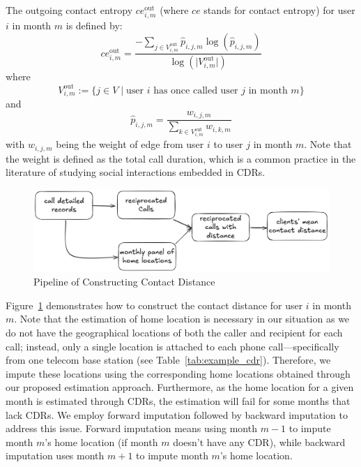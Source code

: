 \begin{definition}
The outgoing contact entropy $ce^{\text{out}}_{i,m}$ (where $ce$ stands for contact entropy) for user $i$ in month $m$ is defined by:
\[
ce^{\text{out}}_{i,m}
=
\frac
{-\sum_{j \in V^{\text{out}}_{i,m}}
\hat{p}_{i,j,m} \log(\hat{p}_{i,j,m})}{\log(\lvert V^\text{out}_{i, m} \rvert )}
\]
where
\begin{equation}\label{eq:outgoing_contacts}
V^{\text{out}}_{i,m}
:=
\{
j \in V
\mid
\text{user } i \text{ has once called user } j \text{ in month } m
\}
\end{equation}
and
\begin{equation}\label{eq:weight_j_for_i_in_month_m}
\hat{p}_{i,j,m}
= \frac{w_{i,j,m}}{\sum_{k \in V^{\text{out}}_{i,m}} w_{i,k,m}}
\end{equation}
with $w_{i,j,m}$ being the weight of edge from user $i$ to user $j$ in month $m$.
Note that the weight is defined as the total call duration, which is a common practice in the literature of studying social interactions embedded in CDRs.
\end{definition}

\begin{figure}[h!]
\centering
\caption{Pipeline of Constructing Contact Distance}
\vspace{0.1cm}

\includegraphics[scale=0.091]{figures/pipeline_mean_contact_distance.png}


\label{fig:pipeline_contact_distance}
\end{figure}

Figure~\ref{fig:pipeline_contact_distance} demonstrates how to construct the contact distance for user $i$ in month $m$.
Note that the estimation of home location is necessary in our situation as we do not have the geographical locations of both the caller and recipient for each call; instead, only a single location is attached to each phone call---specifically from one telecom base station (see Table~\ref{tab:example_cdr}).
Therefore, we impute these locations using the corresponding home locations obtained through our proposed estimation approach.
Furthermore, as the home location for a given month is estimated through CDRs, the estimation will fail for some months that lack CDRs.
We employ forward imputation followed by backward imputation to address this issue. Forward imputation means using month $m-1$ to impute month $m$'s home location (if month $m$ doesn't have any CDR), while backward imputation uses month $m+1$ to impute month $m$'s home location.

